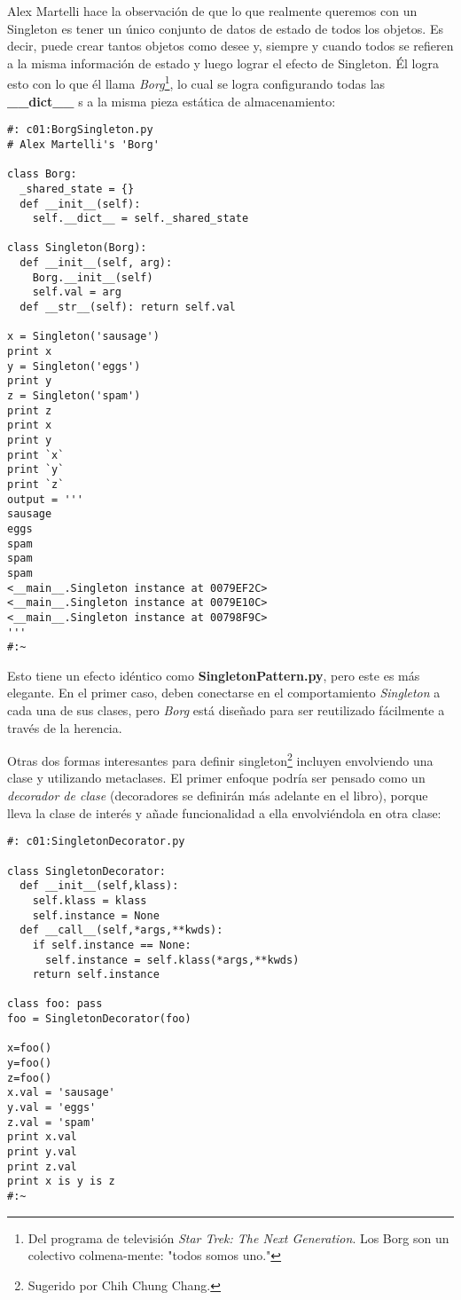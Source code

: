 Alex Martelli hace la observación de que lo que realmente queremos con un Singleton es tener un único conjunto de datos de estado de todos los objetos. Es decir, puede crear tantos objetos como desee y, siempre y cuando todos se refieren a la misma información de estado y luego lograr el efecto de Singleton. Él logra esto con lo que él llama \textit{Borg}\footnote{Del programa de televisión \textit{Star Trek: The Next Generation}. Los Borg son un colectivo colmena-mente: "todos somos uno."}, lo cual se logra configurando todas las \textbf{ \_\_dict\_\_ }s a la misma pieza estática de almacenamiento:     \newline

 \begin{lstlisting}
#: c01:BorgSingleton.py 
# Alex Martelli's 'Borg' 

class Borg: 
  _shared_state = {} 
  def __init__(self): 
    self.__dict__ = self._shared_state 
    
class Singleton(Borg): 
  def __init__(self, arg): 
    Borg.__init__(self) 
    self.val = arg 
  def __str__(self): return self.val 
  
x = Singleton('sausage') 
print x 
y = Singleton('eggs') 
print y 
z = Singleton('spam') 
print z 
print x 
print y 
print `x` 
print `y` 
print `z` 
output = ''' 
sausage 
eggs 
spam 
spam 
spam 
<__main__.Singleton instance at 0079EF2C> 
<__main__.Singleton instance at 0079E10C> 
<__main__.Singleton instance at 00798F9C> 
''' 
#:~     
    \end{lstlisting}

    Esto tiene un efecto idéntico como \textbf{SingletonPattern.py}, pero este es más elegante. En el primer caso, deben conectarse en el comportamiento \textit{Singleton} a cada una de sus clases, pero \textit{Borg} está diseñado para ser reutilizado fácilmente a través de la herencia.     \newline
    
    Otras dos formas interesantes para definir singleton\footnote{Sugerido por Chih Chung Chang.} incluyen envolviendo una clase y utilizando metaclases. 
El primer enfoque podría ser pensado como un \textit{decorador de clase} 
(decoradores se definirán más adelante en el libro), porque lleva la clase de interés y añade funcionalidad a ella envolviéndola en otra clase:   \newline

     \begin{lstlisting}
#: c01:SingletonDecorator.py

class SingletonDecorator: 
  def __init__(self,klass): 
    self.klass = klass 
    self.instance = None 
  def __call__(self,*args,**kwds): 
    if self.instance == None: 
      self.instance = self.klass(*args,**kwds) 
    return self.instance 
    
class foo: pass 
foo = SingletonDecorator(foo) 

x=foo() 
y=foo() 
z=foo() 
x.val = 'sausage' 
y.val = 'eggs' 
z.val = 'spam' 
print x.val 
print y.val 
print z.val 
print x is y is z 
#:~ 
\end{lstlisting}

